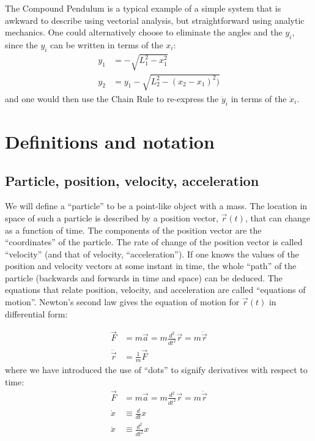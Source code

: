 \begin{example}{0pt}{The Compound Pendulum is a typical example of a simple system that is awkward to describe using vectorial analysis, but straightforward using analytic mechanics.}{}
One could alternatively choose to eliminate the angles and the $y_i$, since the $y_i$ can be written in terms of the $x_i$:
 \begin{align*}
 y_1&=-\sqrt{L_1^2-x_1^2}\\
 y_2&=y_1-\sqrt{L_2^2-(x_2-x_1)^2)}
 \end{align*}
and one would then use the Chain Rule to re-express the $\ddot y_i$ in terms of the $\ddot x_i$.
\label{ex:vectorCompPend}
\end{example}


\section{Definitions and notation}
\subsection{Particle, position, velocity, acceleration}
We will define a ``particle'' to be a point-like object with a mass. The location in space of such a particle is described by a position vector, $\vec{r}(t)$, that can change as a function of time. The components of the position vector are the ``coordinates'' of the particle. The rate of change of the position vector is called ``velocity'' (and that of velocity, ``acceleration''). If one knows the values of the position and velocity vectors at some instant in time, the whole ``path'' of the particle (backwards and forwards in time and space) can be deduced. The equations that relate position, velocity, and acceleration are called ``equations of motion''. Newton's second law gives the equation of motion for $\vec{r}(t)$ in differential form:

\begin{align}
\vec{F}&=m\vec{a}=m\frac{d^2}{dt^2}\vec{r}=m\ddot{\vec{r}}\nonumber\\
\ddot{\vec{r}}&=\frac{1}{m}\vec{F}
\label{eqn:Fma2}
\end{align}
where we have introduced the use of ``dots'' to signify derivatives with respect to time:
\begin{align}
\vec{F}&=m\vec{a}=m\frac{d^2}{dt^2}\vec{r}=m\ddot{\vec{r}}\nonumber\\
\dot{x}&\equiv\frac{d}{dt}x\nonumber\\
\ddot{x}&\equiv\frac{d^2}{dt^2}x\nonumber\\
\label{eqn:defdot}
\end{align}

